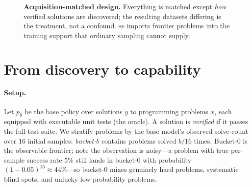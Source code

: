 \documentclass{article}
\newcommand{\se}{\textnormal{\textsc{se}}}
\newcommand{\bon}{\textnormal{\textsc{b}o\textsc{n}}}
\begin{document}
\begin{figure}[t]
\centering
{}
\caption{\textbf{Acquisition-matched design.} Everything is matched except \emph{how} verified solutions are discovered; the resulting datasets differing is the treatment, not a confound. \se{} imports frontier problems into the training support that ordinary sampling cannot supply.}
\label{fig:pipeline}
\end{figure}

\section{From discovery to capability}
\label{sec:method}

\paragraph{Setup.}
Let $p_\theta$ be the base policy over solutions $y$ to programming problems $x$, each equipped with executable unit tests (the oracle). A solution is \emph{verified} if it passes the full test suite. We stratify problems by the base model's observed solve count over $16$ initial samples: \emph{bucket-$b$} contains problems solved $b/16$ times. Bucket-$0$ is the observable frontier; note the observation is noisy---a problem with true per-sample success rate $5\%$ still lands in bucket-$0$ with probability $(1-0.05)^{16} \approx 44\%$---so bucket-$0$ mixes genuinely hard problems, systematic blind spots, and unlucky low-probability problems.
\end{document}
